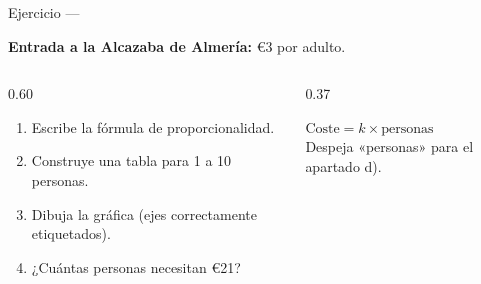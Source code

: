 \documentclass[aspectratio=169, 10pt, spanish]{beamer}
\begin{document}
\begin{frame}{Ejercicio — }
  \begin{aplicarbox}
    \textbf{Entrada a la Alcazaba de Almería:} €3 por adulto.

    \vspace{0.25cm}
    \begin{columns}[t]
      \begin{column}{0.60\textwidth}
        \begin{enumerate}
          \item[\textbf{a)}] Escribe la fórmula de proporcionalidad.
          \item[\textbf{b)}] Construye una tabla para 1 a 10 personas.
          \item[\textbf{c)}] Dibuja la gráfica (ejes correctamente etiquetados).
          \item[\textbf{d)}] ¿Cuántas personas necesitan €21?
        \end{enumerate}
      \end{column}
      \begin{column}{0.37\textwidth}
        \begin{notabox}[Pista]
          $\text{Coste} = k \times \text{personas}$\\[4pt]
          Despeja «personas» para el apartado d).
        \end{notabox}
        \vspace{0.2cm}
      \end{column}
    \end{columns}
  \end{aplicarbox}
\end{frame}
\end{document}
